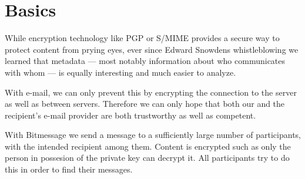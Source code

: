   \section{Basics}

  While encryption technology like PGP or S/MIME provides a secure way to protect content from prying eyes, ever since Edward Snowdens whistleblowing we learned that metadata --- most notably information about who communicates with whom --- is equally interesting and much easier to analyze.

  With e-mail, we can only prevent this by encrypting the connection to the server as well as between servers. Therefore we can only hope that both our and the recipient's e-mail provider are both trustworthy as well as competent.

  With Bitmessage we send a message to a sufficiently large number of participants, with the intended recipient among them. Content is encrypted such as only the person in possesion of the private key can decrypt it. All participants try to do this in order to find their messages.
